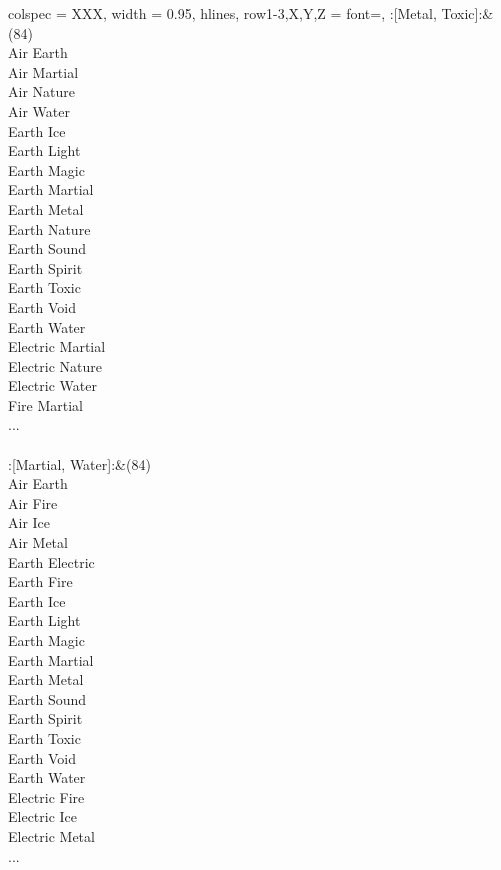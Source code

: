 \begin{longtblr}[
	caption = {2v2 Attacking Effective},
	label = {2v2-Attacking-Effective},
]{
	colspec = {XXX}, width = 0.95\linewidth,
	hlines,
	row{1-3,X,Y,Z} = {font=\bfseries},
}
	:[Metal, Toxic]:&{(84)\\
	Air Earth \\
	Air Martial \\
	Air Nature \\
	Air Water \\
	Earth Ice \\
	Earth Light \\
	Earth Magic \\
	Earth Martial \\
	Earth Metal \\
	Earth Nature \\
	Earth Sound \\
	Earth Spirit \\
	Earth Toxic \\
	Earth Void \\
	Earth Water \\
	Electric Martial \\
	Electric Nature \\
	Electric Water \\
	Fire Martial \\
	...\\
	}\\

	:[Martial, Water]:&{(84)\\
	Air Earth \\
	Air Fire \\
	Air Ice \\
	Air Metal \\
	Earth Electric \\
	Earth Fire \\
	Earth Ice \\
	Earth Light \\
	Earth Magic \\
	Earth Martial \\
	Earth Metal \\
	Earth Sound \\
	Earth Spirit \\
	Earth Toxic \\
	Earth Void \\
	Earth Water \\
	Electric Fire \\
	Electric Ice \\
	Electric Metal \\
	...\\
	}\\


\end{longtblr}
